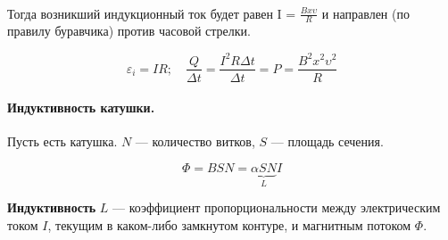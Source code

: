 \documentclass[dvipdfmx]{article}
\begin{document}
\noindent{}
\paragraph{}

Тогда возникший индукционный ток будет равен I = $\frac{Bx\upsilon}{R}$ и направлен (по правилу буравчика)
против часовой стрелки.

\begin{equation*}
  \varepsilon_i = IR; \quad \frac{Q}{\Delta t} = \frac{I^2R\Delta t}{\Delta t} = P = \frac{B^2x^2\upsilon^2}{R}
\end{equation*}

\paragraph{Индуктивность катушки.}

Пусть есть катушка. $N$ --- количество витков, $S$ --- площадь сечения.

\begin{equation*}
  \Phi = BSN = \underbrace{\alpha SN}_{L}I
\end{equation*}

\textbf{Индуктивность} $L$ --- коэффициент пропорциональности между электрическим током $I$, текущим в каком-либо
замкнутом контуре, и магнитным потоком $\Phi$.
\end{document}
